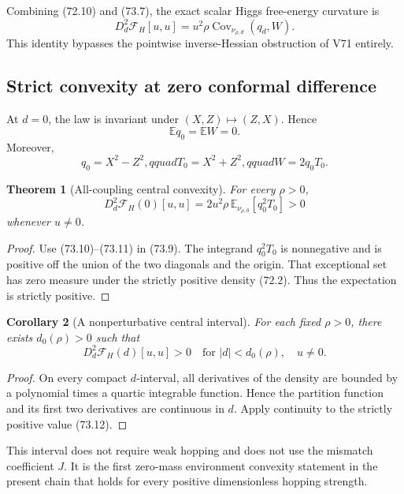 \documentclass[11pt]{article}
\newtheorem{theorem}{Theorem}[section]
\newtheorem{corollary}[theorem]{Corollary}
\theoremstyle{remark}
\begin{document}
Combining (72.10) and (73.7), the exact scalar Higgs free-energy
curvature is
\[
\boxed{
 D_d^2\mathcal F_H[u,u]
 =u^2\rho\operatorname{Cov}_{\nu_{\rho,d}}(q_d,W).}              \tag{73.9}
\]
This identity bypasses the pointwise inverse-Hessian obstruction of
V71 entirely.

\subsection{Strict convexity at zero conformal difference}

At \(d=0\), the law is invariant under \((X,Z)\mapsto(Z,X)\).  Hence
\[
 \mathbb Eq_0=\mathbb EW=0.                       \tag{73.10}
\]
Moreover,
\[
 q_0=X^2-Z^2,qquad T_0=X^2+Z^2,qquad
 W=2q_0T_0.                                      \tag{73.11}
\]

\begin{theorem}[All-coupling central convexity]
\label{thm:v17v73-central}
For every \(\rho>0\),
\[
\boxed{
 D_d^2\mathcal F_H(0)[u,u]
 =2u^2\rho\,
 \mathbb E_{\nu_{\rho,0}}[q_0^2T_0]>0}           \tag{73.12}
\]
whenever \(u\neq0\).
\end{theorem}

\begin{proof}
Use (73.10)--(73.11) in (73.9).  The integrand
\(q_0^2T_0\) is nonnegative and is positive off the union of the two
diagonals and the origin.  That exceptional set has zero measure under
the strictly positive density (72.2).  Thus the expectation is
strictly positive.
\end{proof}

\begin{corollary}[A nonperturbative central interval]
\label{cor:v17v73-interval}
For each fixed \(\rho>0\), there exists
\(d_0(\rho)>0\) such that
\[
 D_d^2\mathcal F_H(d)[u,u]>0
 \quad\text{for }|d|<d_0(\rho),\quad u\neq0.      \tag{73.13}
\]
\end{corollary}

\begin{proof}
On every compact \(d\)-interval, all derivatives of the density are
bounded by a polynomial times a quartic integrable function.  Hence
the partition function and its first two derivatives are continuous
in \(d\).  Apply continuity to the strictly positive value (73.12).
\end{proof}

This interval does not require weak hopping and does not use the
mismatch coefficient \(J\).  It is the first zero-mass environment
convexity statement in the present chain that holds for every positive
dimensionless hopping strength.
\end{document}
